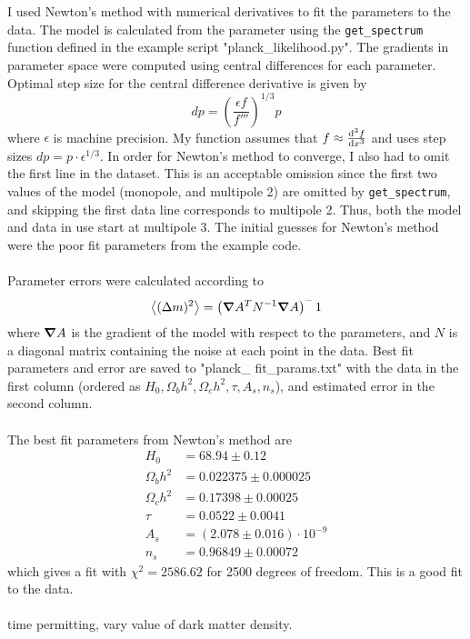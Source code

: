 \documentclass{article}
\newcommand{\<}[1]{\left\langle #1 \right\rangle }
\begin{document}
\section{}
I used Newton's method with numerical derivatives to fit the parameters to the data. The model is calculated from the parameter using the \texttt{get\_spectrum} function defined in the example script "planck\_likelihood.py". The gradients in parameter space were computed using central differences for each parameter. Optimal step size for the central difference derivative is given by 
\[dp = \left(\frac{\epsilon f}{f'''}\right)^{1/3} p\]
where $\epsilon$ is machine precision. My function assumes that $ f \approx \dv[3]{f}{x}$ and uses step sizes $dp = p \cdot \epsilon^{1/3}$. In order for Newton's method to converge, I also had to omit the first line in the dataset. This is an acceptable omission since the first two values of the model (monopole, and multipole 2) are omitted by \texttt{get\_spectrum}, and skipping the first data line corresponds to multipole 2. Thus, both the model and data in use start at multipole 3. The initial guesses for Newton's method were the poor fit parameters from the example code.\\
\\
Parameter errors were calculated according to
\[\<{(\Delta m) ^2} = \left(\grad A^T N^{-1} \grad A\right)^-1\]
where $\grad{A}$ is the gradient of the model with respect to the parameters, and $N$ is a diagonal matrix containing the noise at each point in the data. Best fit parameters and error are saved to "planck\_ fit\_params.txt" with the data in the first column (ordered as $H_0, \Omega_b h^2, \Omega_c h^2, \tau, A_s, n_s$), and estimated error in the second column. \\
\\
The best fit parameters from Newton's method are
\begin{align*}
	H_0 &= 68.94 \pm 0.12\\
	\Omega_b h^2 &= 0.022375 \pm 0.000025\\
	\Omega_c h^2 &= 0.17398 \pm 0.00025\\
	\tau &= 0.0522 \pm 0.0041\\
	A_s &= (2.078 \pm 0.016) \cdot 10^{-9}\\
	n_s &= 0.96849 \pm 0.00072
\end{align*}
which gives a fit with $\chi^2 = 2586.62$ for 2500 degrees of freedom. This is a good fit to the data.\\
\\
time permitting, vary value of dark matter density.
\end{document}
